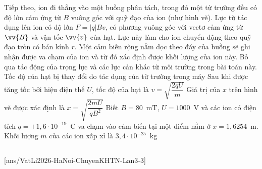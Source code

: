 \begin{ex}
		Tiếp theo, ion đi thẳng vào một buồng phân tách, trong đó một từ trường đều có độ lớn cảm ứng từ $B$ vuông góc với quỹ đạo của ion (như hình vẽ). Lực từ tác dụng lên ion có độ lớn $F=|q|Bv$, có phương vuông góc với vectơ cảm ứng từ $\vv{B}$ và vận tốc $\vv{v}$ của hạt. Lực này làm cho ion chuyển động theo quỹ đạo tròn có bán kính $r$. Một cảm biến rộng nằm dọc theo đáy của buồng sẽ ghi nhận được va chạm của ion và từ đó xác định được khối lượng của ion này. Bỏ qua tác động của trọng lực và các lực cản khác từ môi trường trong bài toán này.
		\choiceTFt
		{Tốc độ của hạt bị thay đổi do tác dụng của từ trường trong máy}
		{\True Sau khi được tăng tốc bởi hiệu điện thế $U$, tốc độ của hạt là $v=\sqrt{\dfrac{2qU}{m}}$}
		{Giá trị của $x$ trên hình vẽ được xác định là $x=\sqrt{\dfrac{2mU}{qB^2}}$}
		{\True Biết $B=80$~mT, $U=1000$~V và các ion có điện tích $q=+1{,}6\cdot 10^{-19}$~C va chạm vào cảm biến tại một điểm nằm ở $x=1{,}6254$~m. Khối lượng $m$ của các ion xấp xỉ là $3{,}4\cdot 10^{-25}$~kg}
	\end{ex}

	\subsection*{}
	\setcounter{ex}{0}
	[ans/VatLi2026-HaNoi-ChuyenKHTN-Lan3-3]

